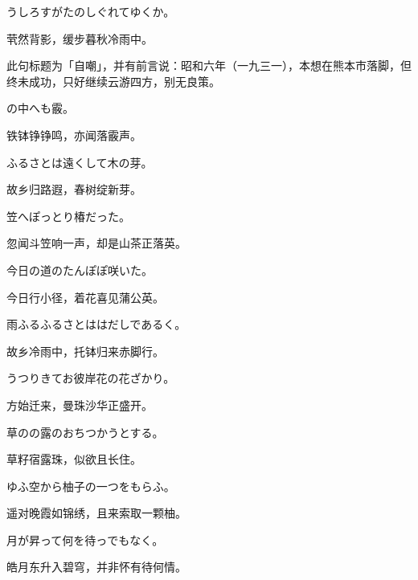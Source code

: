 \begin{haiku}
    {\FH うしろすがたのしぐれてゆくか。}

    {\FK 茕然背影，缓步暮秋冷雨中。}

    {\FS 此句标题为「自嘲」，并有前言说：昭和六年（一九三一），本想在熊本市落脚，但终未成功，只好继续云游四方，别无良策。}
\end{haiku}

\begin{haiku}
    {\FH {}の中へも霰。}

    {\FK 铁钵铮铮鸣，亦闻落霰声。}
\end{haiku}

\begin{haiku}
    {\FH ふるさとは遠くして木の芽。}

    {\FK 故乡归路遐，春树绽新芽。}
\end{haiku}

\begin{haiku}
    {\FH 笠へぽっとり椿だった。}

    {\FK 忽闻斗笠响一声，却是山茶正落英。}
\end{haiku}

\begin{haiku}
    {\FH 今日の道のたんぽぽ咲いた。}

    {\FK 今日行小径，着花喜见蒲公英。}
\end{haiku}

\begin{haiku}
    {\FH 雨ふるふるさとははだしであるく。}

    {\FK 故乡冷雨中，托钵归来赤脚行。}
\end{haiku}

\begin{haiku}
    {\FH うつりきてお彼岸花の花ざかり。}

    {\FK 方始迁来，曼珠沙华正盛开。}
\end{haiku}

\begin{haiku}
    {\FH 草のの露のおちつかうとする。}

    {\FK 草籽宿露珠，似欲且长住。}
\end{haiku}

\begin{haiku}
    {\FH ゆふ空から柚子の一つをもらふ。}

    {\FK 遥对晚霞如锦绣，且来索取一颗柚。}
\end{haiku}

\begin{haiku}
    {\FH 月が昇って何を待っでもなく。}

    {\FK 皓月东升入碧穹，并非怀有待何情。}
\end{haiku}

